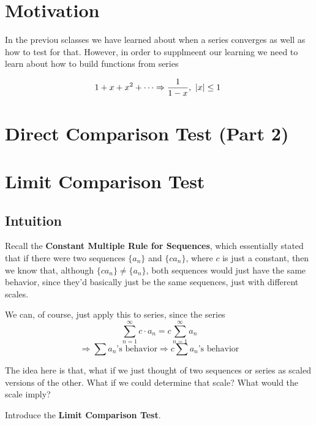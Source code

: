 \documentclass{report}
\newtheorem{definition}{Definition}
\begin{document}
\begin{sloppypar}
\section{Motivation}
In the previou sclasses we have learned about when a series converges as well as how to test for that.
However, in order to supplmeent our learning we need to learn about how to build functions from series

\[ 1 + x + x^{2} + \cdots \Rightarrow \frac{1}{1-x}, \textrm{ $ |x | \leq 1 $ } \]

\section{Direct Comparison Test (Part 2)}
\begin{center}
\end{center}

\section{Limit Comparison Test}
\subsection{Intuition}
Recall the \textbf{Constant Multiple Rule for Sequences}, which essentially
stated that if there were two sequences $ \{a_{n}\} $ and
$ \{ ca_{n}\}$, where $ c $ is just a constant, then we
know that, although $ \{ ca_{n}\} \neq \{ a_{n}\} $, both
sequences would just have the same behavior, since they'd
basically just be the same sequences, just with different
scales.

\par We can, of course, just apply this to series, since
the series
\[ \sum_{n=1}^{\infty} c \cdot a_{n} = c \sum_{n=1}^{\infty} a_{n}\]
\[ \Rightarrow \sum a_{n} \textrm{'s behavior} \Rightarrow c \sum a_{n}
\textrm{'s behavior}\]

The idea here is that, what if we just thought of
two sequences or series as scaled versions of the other. What if we
could determine that scale? What would the scale imply?

Introduce the \textbf{Limit Comparison Test}.

\begin{center}
\end{center}
\end{sloppypar}
\end{document}
